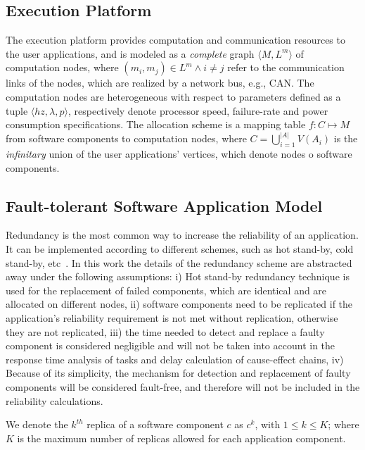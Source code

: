 \subsection{Execution Platform}
The execution platform provides computation and communication resources to the user applications, and is modeled as a \textit{complete} graph $\langle M,L^m\rangle$ of computation nodes, where $(m_i,m_j)\in L^m \land i\neq j$ refer to the communication links of the nodes, which are realized by a network bus, e.g., CAN. The computation nodes are heterogeneous with respect to parameters defined as a tuple $\langle hz, \lambda, p \rangle$, respectively denote processor speed, failure-rate and power consumption specifications. The allocation scheme is a mapping table $f:C\mapsto M$ from software components to computation nodes, where $C=\bigcup_{i=1}^{|A|} {V(A_i)}$ is the \textit{infinitary} union of the user applications' vertices, which denote nodes o software components.

\subsection{Fault-tolerant Software Application Model}
Redundancy is the most common way to increase the reliability of an application. It can be implemented according to different schemes, such as hot stand-by, cold stand-by, etc~\cite{Dubrova2013Fault-tolerantDesign}. In this work the details of the redundancy scheme are abstracted away under the following assumptions: i) Hot stand-by redundancy technique is used for the replacement of failed components, which are identical and are allocated on different nodes, ii) software components need to be replicated if the application's reliability requirement is not met without replication, otherwise they are not replicated, iii) the time needed to detect and replace a faulty component is considered negligible and will not be taken into account in the response time analysis of tasks and delay calculation of cause-effect chains, iv) Because of its simplicity, the mechanism for detection and replacement of faulty components will be considered fault-free, and therefore will not be included in the reliability calculations.

We denote the $k^{th}$ replica of a software component $c$ as $c^k$, with $1\le k\leq K$; where $K$ is the maximum number of replicas allowed for each application component.

